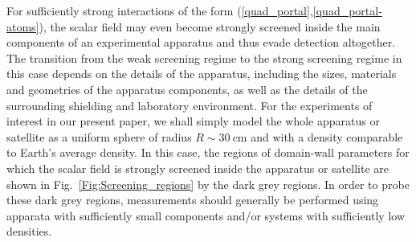 \documentclass[aps,prd,onecolumn,nofootinbib]{revtex4-2} %
\begin{document}
For sufficiently strong interactions of the form (\ref{quad_portal},\ref{quad_portal-atoms}), the scalar field may even become strongly screened inside the main components of an experimental apparatus and thus evade detection altogether. 
The transition from the weak screening regime to the strong screening regime in this case depends on the details of the apparatus, including the sizes, materials and geometries of the apparatus components, as well as the details of the surrounding shielding and laboratory environment. 
For the experiments of interest in our present paper, we shall simply model the whole apparatus or satellite as a uniform sphere of radius $R \sim 30~\textrm{cm}$ and with a density comparable to Earth's average density. 
In this case, the regions of domain-wall parameters for which the scalar field is strongly screened inside the apparatus or satellite are shown in Fig.~\ref{Fig:Screening_regions} by the dark grey regions. 
In order to probe these dark grey regions, measurements should generally be performed using apparata with sufficiently small components and/or systems with sufficiently low densities. 
\end{document}
